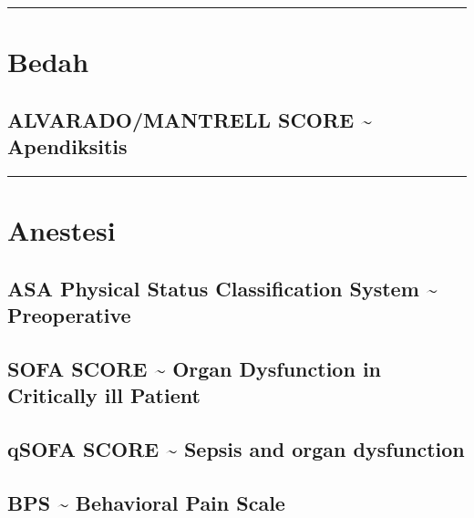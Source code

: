 \documentclass[
]{book}
\begin{document}
\begin{center}\rule{0.5\linewidth}{0.5pt}\end{center}

\hypertarget{bedah}{%
\section{Bedah}\label{bedah}}

\hypertarget{alvaradomantrell-score-apendiksitis}{%
\subsection{ALVARADO/MANTRELL SCORE \textasciitilde{} Apendiksitis}\label{alvaradomantrell-score-apendiksitis}}

\begin{center}\rule{0.5\linewidth}{0.5pt}\end{center}

\hypertarget{anestesi}{%
\section{Anestesi}\label{anestesi}}

\hypertarget{asa-physical-status-classification-system-preoperative}{%
\subsection{ASA Physical Status Classification System \textasciitilde{} Preoperative}\label{asa-physical-status-classification-system-preoperative}}

\hypertarget{sofa-score-organ-dysfunction-in-critically-ill-patient}{%
\subsection{SOFA SCORE \textasciitilde{} Organ Dysfunction in Critically ill Patient}\label{sofa-score-organ-dysfunction-in-critically-ill-patient}}

\hypertarget{qsofa-score-sepsis-and-organ-dysfunction}{%
\subsection{qSOFA SCORE \textasciitilde{} Sepsis and organ dysfunction}\label{qsofa-score-sepsis-and-organ-dysfunction}}

\hypertarget{bps-behavioral-pain-scale}{%
\subsection{BPS \textasciitilde{} Behavioral Pain Scale}\label{bps-behavioral-pain-scale}}
\end{document}
